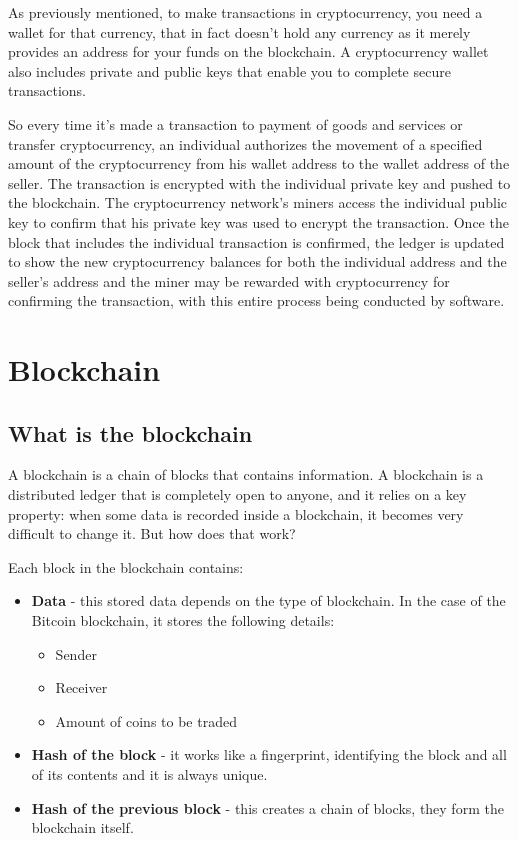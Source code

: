 \documentclass{article}
\newcommand\tab[1][1cm]{\hspace*{#1}}
\begin{document}
As previously mentioned, to make transactions in cryptocurrency, you need a wallet for that currency, that in fact doesn't hold any currency as it merely provides an address for your funds on the blockchain. A cryptocurrency wallet also includes private and public keys that enable you to complete secure transactions.

So every time it's made a transaction to payment of goods and services or transfer cryptocurrency, an individual authorizes the movement of a specified amount of the cryptocurrency from his wallet address to the wallet address of the seller. The transaction is encrypted with the individual private key and pushed to the blockchain. The cryptocurrency network's miners access the individual public key to confirm that his private key was used to encrypt the transaction. Once the block that includes the individual transaction is confirmed, the ledger is updated to show the new cryptocurrency balances for both the individual address and the seller's address and the miner may be rewarded with cryptocurrency for confirming the transaction, with this entire process being conducted by software.

\section{Blockchain}

\subsection{What is the blockchain}

\tab A blockchain is a chain of blocks that contains information. A blockchain is a distributed ledger that is completely open to anyone, and it relies on a key property: when some data is recorded inside a blockchain, it becomes very difficult to change it. But how does that work?

Each block in the blockchain contains:

\begin{itemize}
    \item \textbf{Data} - this stored data depends on the type of blockchain. In the case of the Bitcoin blockchain, it stores the following details:
    \begin{itemize}
        \item Sender
        \item Receiver
        \item Amount of coins to be traded
    \end{itemize}
    \item \textbf{Hash of the block} - it works like a fingerprint, identifying the block and all of its contents and it is always unique.
    \item \textbf{Hash of the previous block} - this creates a chain of blocks, they form the blockchain itself.
\end{itemize}
\end{document}
